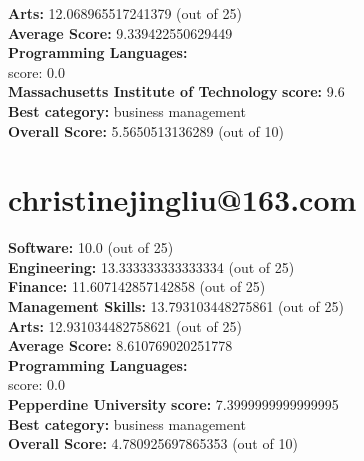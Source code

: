 \documentclass{article}
\begin{document}
\textbf{Arts:} 12.068965517241379 (out of 25)\\
\textbf{Average Score: } 9.339422550629449\\
\textbf{Programming Languages:} \\
score: 0.0\\
\textbf{Massachusetts Institute of Technology} \textbf{score:} 9.6\\
\textbf{Best category: } business management\\
\textbf{Overall Score: }5.5650513136289 (out of 10)\section{christinejingliu@163.com}
\textbf{Software:} 10.0 (out of 25)\\
\textbf{Engineering: } 13.333333333333334 (out of 25)\\
\textbf{Finance:} 11.607142857142858 (out of 25)\\
\textbf{Management Skills:} 13.793103448275861 (out of 25)\\
\textbf{Arts:} 12.931034482758621 (out of 25)\\
\textbf{Average Score: } 8.610769020251778\\
\textbf{Programming Languages:} \\
score: 0.0\\
\textbf{Pepperdine University} \textbf{score:} 7.3999999999999995\\
\textbf{Best category: } business management\\
\textbf{Overall Score: }4.780925697865353 (out of 10)
\end{document}
